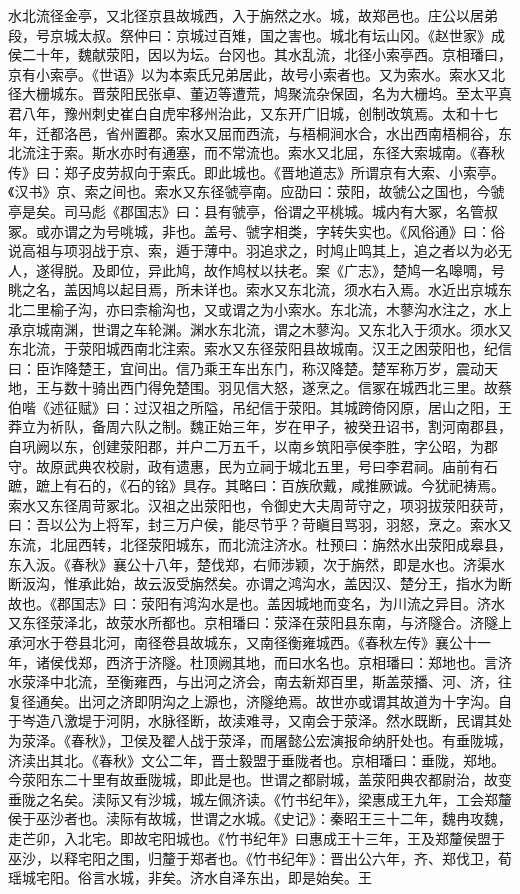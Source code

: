 \documentclass[12pt,UTF8]{ctexbook}
\begin{document}
水北流径金亭，又北径京县故城西，入于旃然之水。城，故郑邑也。庄公以居弟段，号京城太叔。祭仲曰：京城过百雉，国之害也。城北有坛山冈。《赵世家》成侯二十年，魏献荥阳，因以为坛。台冈也。其水乱流，北径小索亭西。京相璠曰，京有小索亭。《世语》以为本索氏兄弟居此，故号小索者也。又为索水。索水又北径大栅城东。晋荥阳民张卓、董迈等遭荒，鸠聚流杂保固，名为大栅坞。至太平真君八年，豫州刺史崔白自虎牢移州治此，又东开广旧城，创制改筑焉。太和十七年，迁都洛邑，省州置郡。索水又屈而西流，与梧桐涧水合，水出西南梧桐谷，东北流注于索。斯水亦时有通塞，而不常流也。索水又北屈，东径大索城南。《春秋传》曰：郑子皮劳叔向于索氏。即此城也。《晋地道志》所谓京有大索、小索亭。《汉书》京、索之间也。索水又东径虢亭南。应劭曰：荥阳，故虢公之国也，今虢亭是矣。司马彪《郡国志》曰：县有虢亭，俗谓之平桃城。城内有大冢，名管叔冢。或亦谓之为号咷城，非也。盖号、虢字相类，字转失实也。《风俗通》曰：俗说高祖与项羽战于京、索，遁于薄中。羽追求之，时鸠止鸣其上，追之者以为必无人，遂得脱。及即位，异此鸠，故作鸠杖以扶老。案《广志》，楚鸠一名嗥啁，号眺之名，盖因鸠以起目焉，所未详也。索水又东北流，须水右入焉。水近出京城东北二里榆子沟，亦曰柰榆沟也，又或谓之为小索水。东北流，木蓼沟水注之，水上承京城南渊，世谓之车轮渊。渊水东北流，谓之木蓼沟。又东北入于须水。须水又东北流，于荥阳城西南北注索。索水又东径荥阳县故城南。汉王之困荥阳也，纪信曰：臣诈降楚王，宜间出。信乃乘王车出东门，称汉降楚。楚军称万岁，震动天地，王与数十骑出西门得免楚围。羽见信大怒，遂烹之。信冢在城西北三里。故蔡伯喈《述征赋》曰：过汉祖之所隘，吊纪信于荥阳。其城跨倚冈原，居山之阳，王莽立为祈队，备周六队之制。魏正始三年，岁在甲子，被癸丑诏书，割河南郡县，自巩阙以东，创建荥阳郡，并户二万五千，以南乡筑阳亭侯李胜，字公昭，为郡守。故原武典农校尉，政有遗惠，民为立祠于城北五里，号曰李君祠。庙前有石蹠，蹠上有石的，《石的铭》具存。其略曰：百族欣戴，咸推厥诚。今犹祀祷焉。索水又东径周苛冢北。汉祖之出荥阳也，令御史大夫周苛守之，项羽拔荥阳获苛，曰：吾以公为上将军，封三万户侯，能尽节乎？苛瞋目骂羽，羽怒，烹之。索水又东流，北屈西转，北径荥阳城东，而北流注济水。杜预曰：旃然水出荥阳成皋县，东入汳。《春秋》襄公十八年，楚伐郑，右师涉颖，次于旃然，即是水也。济渠水断汳沟，惟承此始，故云汳受旃然矣。亦谓之鸿沟水，盖因汉、楚分王，指水为断故也。《郡国志》曰：荥阳有鸿沟水是也。盖因城地而变名，为川流之异目。济水又东径荥泽北，故荥水所都也。京相璠曰：荥泽在荥阳县东南，与济隧合。济隧上承河水于卷县北河，南径卷县故城东，又南径衡雍城西。《春秋左传》襄公十一年，诸侯伐郑，西济于济隧。杜顶阙其地，而曰水名也。京相璠曰：郑地也。言济水荥泽中北流，至衡雍西，与出河之济会，南去新郑百里，斯盖荥播、河、济，往复径通矣。出河之济即阴沟之上源也，济隧绝焉。故世亦或谓其故道为十字沟。自于岑造八激堤于河阴，水脉径断，故渎难寻，又南会于荥泽。然水既断，民谓其处为荥泽。《春秋》，卫侯及翟人战于荥泽，而屠懿公宏演报命纳肝处也。有垂陇城，济渎出其北。《春秋》文公二年，晋士毅盟于垂陇者也。京相璠曰：垂陇，郑地。今荥阳东二十里有故垂陇城，即此是也。世谓之都尉城，盖荥阳典农都尉治，故变垂陇之名矣。渎际又有沙城，城左佩济读。《竹书纪年》，梁惠成王九年，工会郑釐侯于巫沙者也。渎际有故城，世谓之水城。《史记》：秦昭王三十二年，魏冉攻魏，走芒卯，入北宅。即故宅阳城也。《竹书纪年》曰惠成王十三年，王及郑釐侯盟于巫沙，以释宅阳之围，归釐于郑者也。《竹书纪年》：晋出公六年，齐、郑伐卫，荀瑶城宅阳。俗言水城，非矣。济水自泽东出，即是始矣。王
\end{document}
